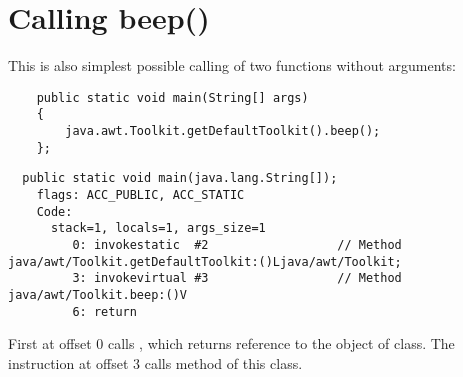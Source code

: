 \section{Calling beep()}

This is also simplest possible calling of two functions without arguments:

\begin{lstlisting}
	public static void main(String[] args)
	{
		java.awt.Toolkit.getDefaultToolkit().beep();
	};
\end{lstlisting}

\begin{lstlisting}
  public static void main(java.lang.String[]);
    flags: ACC_PUBLIC, ACC_STATIC
    Code:
      stack=1, locals=1, args_size=1
         0: invokestatic  #2                  // Method java/awt/Toolkit.getDefaultToolkit:()Ljava/awt/Toolkit;
         3: invokevirtual #3                  // Method java/awt/Toolkit.beep:()V
         6: return        
\end{lstlisting}

First  at offset 0 calls , which returns
reference to the object of  class.
The  instruction at offset 3 calls  method of this class.
